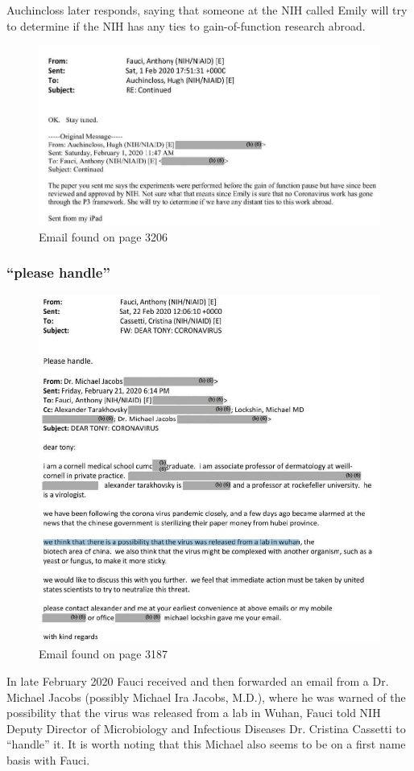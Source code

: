 \documentclass[11pt]{article}
\begin{document}
Auchincloss later responds, saying that someone at the NIH called Emily will try to determine if the NIH has any ties to gain-of-function research abroad.

\begin{figure}[htbp]
\centering
\includegraphics[width=.9\linewidth]{./images/email-auchincloss-responds.png}
\caption{Email found on page 3206}
\end{figure}

\subsubsection{``please handle''}
\label{sec:orgc00330f}
\begin{figure}[htbp]
\centering
\includegraphics[width=.9\linewidth]{./images/email-please-handle.png}
\caption{Email found on page 3187}
\end{figure}
In late February 2020 Fauci received and then forwarded an email from a Dr. Michael Jacobs (possibly Michael Ira Jacobs, M.D.), where he was warned of the possibility that the virus was released from a lab in Wuhan, Fauci told NIH Deputy Director of Microbiology and Infectious Diseases Dr. Cristina Cassetti to ``handle'' it. It is worth noting that this Michael also seems to be on a first name basis with Fauci.
\end{document}
